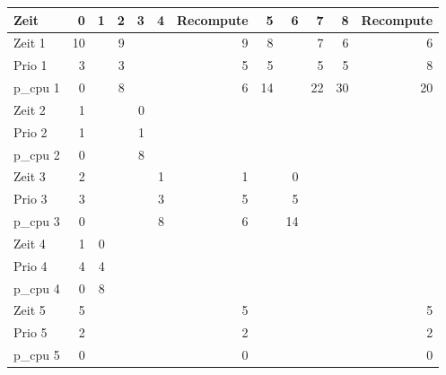 \documentclass[10pt,a4paper]{article}
\begin{document}
\begin{tabular}{lrrrrrrrrrrr}
Zeit & 0 & 1 & 2 & 3 & 4 & Recompute & 5 & 6 & 7 & 8 & Recompute\\
\hline
Zeit 1 & 10 &  & 9 &  &  & 9 & 8 &  & 7 & 6 & 6\\
Prio 1 & 3 &  & 3 &  &  & 5 & 5 &  & 5 & 5 & 8\\
p\_cpu 1 & 0 &  & 8 &  &  & 6 & 14 &  & 22 & 30 & 20\\
Zeit 2 & 1 &  &  & 0 &  &  &  &  &  &  & \\
Prio 2 & 1 &  &  & 1 &  &  &  &  &  &  & \\
p\_cpu 2 & 0 &  &  & 8 &  &  &  &  &  &  & \\
Zeit 3 & 2 &  &  &  & 1 & 1 &  & 0 &  &  & \\
Prio 3 & 3 &  &  &  & 3 & 5 &  & 5 &  &  & \\
p\_cpu 3 & 0 &  &  &  & 8 & 6 &  & 14 &  &  & \\
Zeit 4 & 1 & 0 &  &  &  &  &  &  &  &  & \\
Prio 4 & 4 & 4 &  &  &  &  &  &  &  &  & \\
p\_cpu 4 & 0 & 8 &  &  &  &  &  &  &  &  & \\
Zeit 5 & 5 &  &  &  &  & 5 &  &  &  &  & 5\\
Prio 5 & 2 &  &  &  &  & 2 &  &  &  &  & 2\\
p\_cpu 5 & 0 &  &  &  &  & 0 &  &  &  &  & 0\\
\end{tabular}

\end{document}
